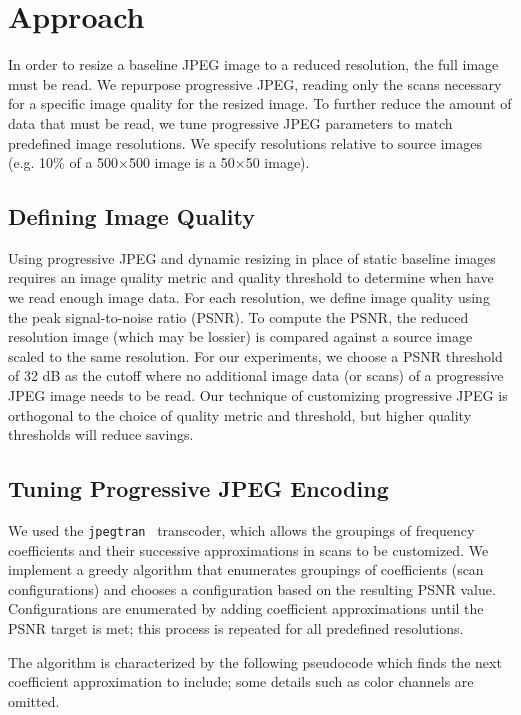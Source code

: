 \section{Approach}
In order to resize a baseline JPEG image to a reduced resolution, the full image must be read.
We repurpose progressive JPEG, reading only the scans necessary for a specific image quality for the resized image.
To further reduce the amount of data that must be read, we tune progressive JPEG parameters to match predefined image resolutions.
We specify resolutions relative to source images (e.g. 10\% of a
500$\times$500 image is a 50$\times$50 image).

\subsection{Defining Image Quality}
\label{Defining Image Quality}
Using progressive JPEG and dynamic resizing in place of static baseline images requires an image quality metric and quality threshold to determine when have we read enough image data.
For each resolution, we define image quality using the peak signal-to-noise ratio (PSNR). 
To compute the PSNR, the reduced resolution image (which may be lossier) is compared against a source image scaled to the same resolution.
For our experiments, we choose a PSNR threshold of 32 dB as the cutoff where no additional image data (or scans) of a progressive JPEG image needs to be read.
Our technique of customizing progressive JPEG is orthogonal to the choice of quality metric and threshold, but higher quality thresholds will reduce savings.

\subsection{Tuning Progressive JPEG Encoding}
We used the \texttt{jpegtran}~\cite{independent2014libjpeg} transcoder, %
 which allows the groupings of frequency coefficients and their successive approximations in scans to be customized.
We implement a greedy algorithm that enumerates groupings of coefficients (scan configurations) and chooses a configuration based on the resulting PSNR value.
Configurations are enumerated by adding coefficient approximations until the PSNR target is met; this process is repeated for all predefined resolutions.

The algorithm is characterized by the following pseudocode which finds the next coefficient approximation to include; some details such as color channels are omitted.

